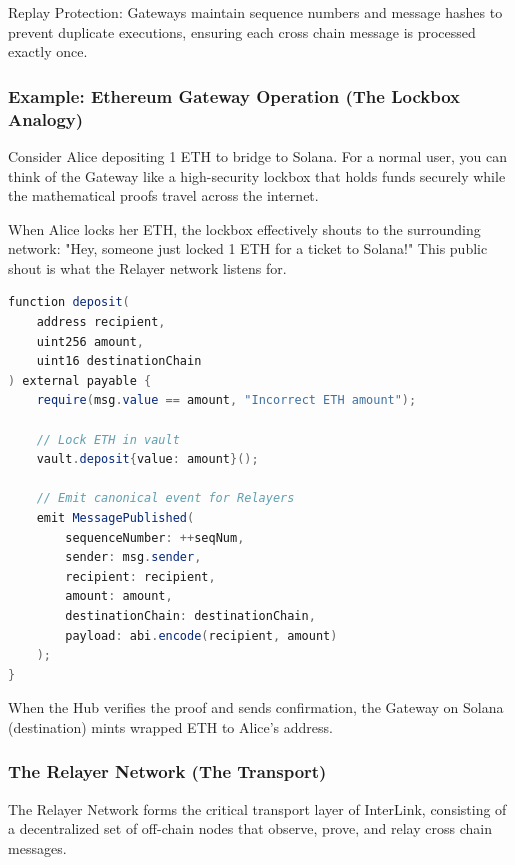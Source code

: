 \documentclass[11pt,a4paper]{article}
\begin{document}
Replay Protection: Gateways maintain sequence numbers and message hashes to prevent duplicate executions, ensuring each cross chain message is processed exactly once.

\subsubsection*{Example: Ethereum Gateway Operation (The Lockbox Analogy)}

Consider Alice depositing 1 ETH to bridge to Solana. For a normal user, you can think of the Gateway like a high-security lockbox that holds funds securely while the mathematical proofs travel across the internet. 

When Alice locks her ETH, the lockbox effectively shouts to the surrounding network: "Hey, someone just locked 1 ETH for a ticket to Solana!" This public shout is what the Relayer network listens for.

\begin{lstlisting}[language=Java, caption={Ethereum Gateway Deposit Function}]
function deposit(
    address recipient,
    uint256 amount,
    uint16 destinationChain
) external payable {
    require(msg.value == amount, "Incorrect ETH amount");
    
    // Lock ETH in vault
    vault.deposit{value: amount}();
    
    // Emit canonical event for Relayers
    emit MessagePublished(
        sequenceNumber: ++seqNum,
        sender: msg.sender,
        recipient: recipient,
        amount: amount,
        destinationChain: destinationChain,
        payload: abi.encode(recipient, amount)
    );
}
\end{lstlisting}

When the Hub verifies the proof and sends confirmation, the Gateway on Solana (destination) mints wrapped ETH to Alice's address.

\subsubsection{The Relayer Network (The Transport)}

The Relayer Network forms the critical transport layer of InterLink, consisting of a decentralized set of off-chain nodes that observe, prove, and relay cross chain messages. 
\end{document}
